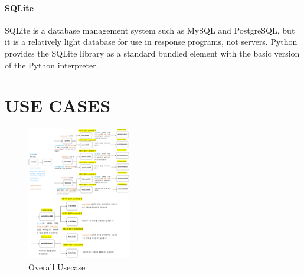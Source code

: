 \documentclass[conference]{IEEEtran}
\begin{document}
\paragraph{SQLite}
SQLite is a database management system such as MySQL and PostgreSQL, but it is a relatively light database for use in response programs, not servers. Python provides the SQLite library as a standard bundled element with the basic version of the Python interpreter.

\section{USE CASES}
\begin{figure}[h]
\centering
    \includegraphics[width =4.5cm]{pictures/picture6.eps}
    \hfil
\caption{Overall Usecase}
\end{figure}
\end{document}
